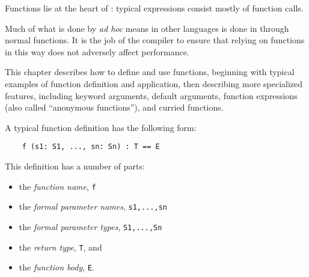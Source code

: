

Functions lie at the heart of \asharp{}:
typical expressions consist mostly of function calls.

Much of what is done by {\em ad hoc} means in other languages
is done in \asharp{} through normal functions.
It is the job of the compiler to ensure that relying on functions
in this way does not adversely affect performance.

This chapter describes how to define and use functions, beginning with
typical examples of function definition and application, then describing
more specialized features, including keyword arguments, default
arguments, function expressions (also called ``anonymous functions''),
and curried functions.


A typical function definition has the following form:

\begin{small}
\begin{verbatim}
    f (s1: S1, ..., sn: Sn) : T == E
\end{verbatim}
\end{small}

This definition has a number of parts:
\begin{itemize}
\item the {\em function name\/}, {\tt f}
\item the {\em formal parameter names\/}, {\tt s1,...,sn}
\item the {\em formal parameter types\/}, {\tt S1,...,Sn}
\item the {\em return type\/}, {\tt T}, and
\item the {\em function body\/}, {\tt E}.
\end{itemize}

